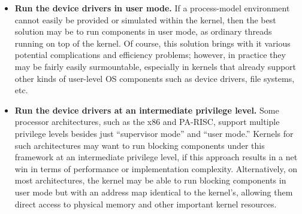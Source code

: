 \begin{itemize}
\item	{\bf Run the device drivers in user mode.}
	If a process-model environment cannot easily
	be provided or simulated within the kernel,
	then the best solution may be
	to run components in user mode,
	as ordinary threads running on top of the kernel.
	Of course, this solution brings with it
	various potential complications and efficiency problems;
	however, in practice they may be fairly easily surmountable,
	especially in kernels that already support
	other kinds of user-level OS components
	such as device drivers, file systems, etc.

\item	{\bf Run the device drivers at an intermediate privilege level.}
	Some processor architectures, such as the x86 and {\sc PA-RISC},
	support multiple privilege levels
	besides just ``supervisor mode'' and ``user mode.''
	Kernels for such architectures
	may want to run blocking \oskit{} components under this framework
	at an intermediate privilege level,
	if this approach results in a net win
	in terms of performance or implementation complexity.
	Alternatively, on most architectures,
	the kernel may be able to run blocking \oskit{} components
	in user mode but with an address map identical to the kernel's,
	allowing them direct access to physical memory
	and other important kernel resources.
\end{itemize}

